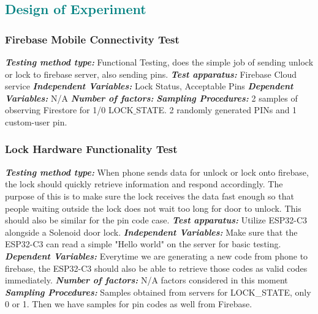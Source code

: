 \textcolor{teal}{\subsection*{Design of Experiment}}
\subsubsection{Firebase Mobile Connectivity Test}
\textbf{\textit{Testing method type:}} Functional Testing, does the simple job of sending unlock or lock to firebase server, also sending pins.
\newline
\textbf{\textit{Test apparatus:}} Firebase Cloud service
\newline
\textbf{\textit{Independent Variables:}} Lock Status, Acceptable Pins
\newline
\textbf{\textit{Dependent Variables:}} N/A
\newline
\textbf{\textit{Number of factors:}}
\newline
\textbf{\textit{Sampling Procedures:}} 2 samples of observing Firestore for 1/0 LOCK$\_$STATE. 2 randomly generated PINs and 1 custom-user pin.

\subsubsection{Lock Hardware Functionality Test}
\textbf{\textit{Testing method type:}} When phone sends data for unlock or lock onto firebase, the lock should quickly retrieve information and respond accordingly. The purpose of this is to make sure the lock receives the data fast enough so that people waiting outside the lock does not wait too long for door to unlock. This should also be similar for the pin code case.
\newline
\textbf{\textit{Test apparatus:}} Utilize ESP32-C3 alongside a Solenoid door lock.
\newline
\textbf{\textit{Independent Variables:}} Make sure that the ESP32-C3 can read a simple "Hello world" on the server for basic testing.
\newline
\textbf{\textit{Dependent Variables:}} Everytime we are generating a new code from phone to firebase, the ESP32-C3 should also be able to retrieve those codes as valid codes immediately.
\newline
\textbf{\textit{Number of factors:}} N/A factors considered in this moment
\newline
\textbf{\textit{Sampling Procedures:}} Samples obtained from servers for LOCK\_STATE, only 0 or 1. Then we have samples for pin codes as well from Firebase.
\newline

